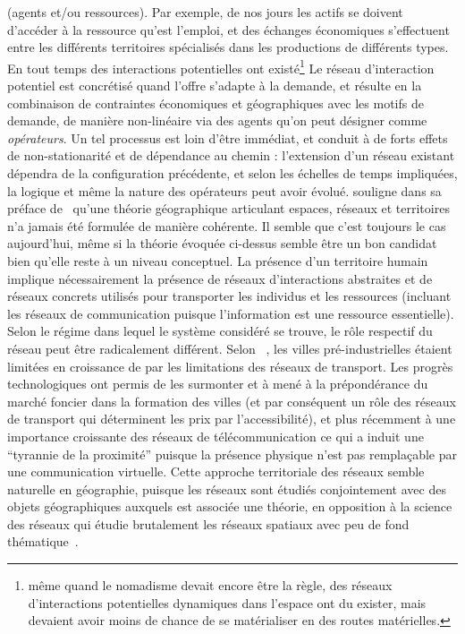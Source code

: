 {(agents et/ou ressources). Par exemple, de nos jours les actifs se doivent d'accéder à la ressource qu'est l'emploi, et des échanges économiques s'effectuent entre les différents territoires spécialisés dans les productions de différents types. En tout temps des interactions potentielles ont existé\footnote{même quand le nomadisme devait encore être la règle, des réseaux d'interactions potentielles dynamiques dans l'espace ont du exister, mais devaient avoir moins de chance de se matérialiser en des routes matérielles.} Le réseau d'interaction potentiel est concrétisé quand l'offre s'adapte à la demande, et résulte en la combinaison de contraintes économiques et géographiques avec les motifs de demande, de manière non-linéaire via des agents qu'on peut désigner comme \emph{opérateurs}. Un tel processus est loin d'être immédiat, et conduit à de forts effets de non-stationarité et de dépendance au chemin : l'extension d'un réseau existant dépendra de la configuration précédente, et selon les échelles de temps impliquées, la logique et même la nature des opérateurs peut avoir évolué.  souligne dans sa préface de~\cite{offner1996reseaux} qu'une théorie géographique articulant espaces, réseaux et territoires n'a jamais été formulée de manière cohérente. Il semble que c'est toujours le cas aujourd'hui, même si la théorie évoquée ci-dessus semble être un bon candidat bien qu'elle reste à un niveau conceptuel. La présence d'un territoire humain implique nécessairement la présence de réseaux d'interactions abstraites et de réseaux concrets utilisés pour transporter les individus et les ressources (incluant les réseaux de communication puisque l'information est une ressource essentielle). Selon le régime dans lequel le système considéré se trouve, le rôle respectif du réseau peut être radicalement différent. Selon ~\cite{duranton1999distance}, les villes pré-industrielles étaient limitées en croissance de par les limitations des réseaux de transport. Les progrès technologiques ont permis de les surmonter et à mené à la prépondérance du marché foncier dans la formation des villes (et par conséquent un rôle des réseaux de transport qui déterminent les prix par l'accessibilité), et plus récemment à une importance croissante des réseaux de télécommunication ce qui a induit une ``tyrannie de la proximité'' puisque la présence physique n'est pas remplaçable par une communication virtuelle. Cette approche territoriale des réseaux semble naturelle en géographie, puisque les réseaux sont étudiés conjointement avec des objets géographiques auxquels est associée une théorie, en opposition à la science des réseaux qui étudie brutalement les réseaux spatiaux avec peu de fond thématique~\cite{ducruet2014spatial}.
}

